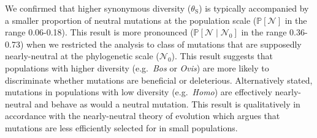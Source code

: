 \documentclass{article}
\newcommand{\proba}{\mathbb{P}}
\newcommand{\SphyNeu}{\mathcal{N}_0}
\newcommand{\given}{\mid}
\newcommand{\SpopNeu}{\mathcal{N}}
\newcommand{\thetaSyn}{\theta_{\text{S}}}
\begin{document}
    We confirmed that higher synonymous diversity ($\thetaSyn$) is typically accompanied by a smaller proportion of neutral mutations at the population scale ($\proba [ \SpopNeu ]$ in the range 0.06-0.18).
    This result is more pronounced ($\proba [ \SpopNeu \given \SphyNeu ]$ in the range 0.36-0.73) when we restricted the analysis to class of mutations that are supposedly nearly-neutral at the phylogenetic scale ($\SphyNeu$).
    This result suggests that populations with higher diversity (e.g.~\textit{Bos} or \textit{Ovis}) are more likely to discriminate whether mutations are beneficial or deleterious.
    Alternatively stated, mutations in populations with low diversity (e.g.~\textit{Homo}) are effectively nearly-neutral and behave as would a neutral mutation.
    This result is qualitatively in accordance with the nearly-neutral theory of evolution which argues that mutations are less efficiently selected for in small populations.
\end{document}
